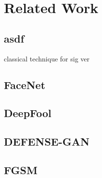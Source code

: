 \section{Related Work}\label{sec:related_work}

\subsection{asdf}
classical technique for sig ver

\subsection{FaceNet}

\subsection{DeepFool}
\subsection{DEFENSE-GAN}

\subsection{FGSM}
